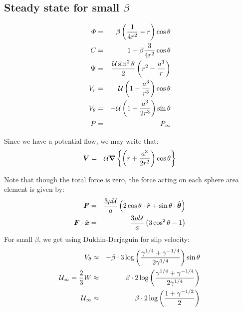 \subsection{Steady state for small $\beta$}
\begin{eqnarray}
  \varPhi &=& \beta \left(\frac{1}{4r^2} - r\right) \cos\theta \\
  C &=&  1 + \beta\frac{3}{4r^2} \cos\theta \\
  \Psi &=& \frac{\mathcal{U} \sin^2\theta}{2} \left(r^2 - \frac{a^3}{r}\right) \\
  V_r &=& \mathcal{U} \left(1 - \frac{a^3}{r^3}\right) \cos\theta \\
  V_\theta &=& -\mathcal{U} \left(1 + \frac{a^3}{2r^3}\right) \sin\theta \\
  P &=& P_\infty
\end{eqnarray}

Since we have a potential flow, we may write that:
\begin{eqnarray}
  \boldsymbol{V} &=& \mathcal{U}\boldsymbol{\nabla} \left\{\left(r + \frac{a^3}{2r^2}\right) \cos\theta\right\}
\end{eqnarray}

Note that though the total force is zero,
the force acting on each sphere area element is given by:
\begin{eqnarray}
  \boldsymbol{F} &=& \frac{3\mu\mathcal{U}}{a}
  \left( 2\cos\theta \cdot \hat{\boldsymbol{r}} + \sin\theta \cdot \hat{\boldsymbol{\theta}}\right) \\
  \boldsymbol{F} \cdot \hat{\boldsymbol{x}} &=& \frac{3\mu\mathcal{U}}{a} \left( 3\cos^2\theta - 1\right)
\end{eqnarray}
For small $\beta$, we get using Dukhin-Derjaguin for slip velocity:
\begin{eqnarray}
V_\theta & \approx & -\beta \cdot 3
\log\left(\frac{\gamma^{1/4} + \gamma^{-1/4}}{2\gamma^{1/4}}\right) \sin\theta \\
\mathcal{U}_\infty = \frac{2}{3} W &\approx& \beta \cdot 2
\log\left(\frac{\gamma^{1/4} + \gamma^{-1/4}}{2\gamma^{1/4}}\right) \\
\mathcal{U}_\infty &\approx& \beta \cdot 2
\log\left(\frac{1 + \gamma^{-1/2}}{2}\right)
\end{eqnarray}

